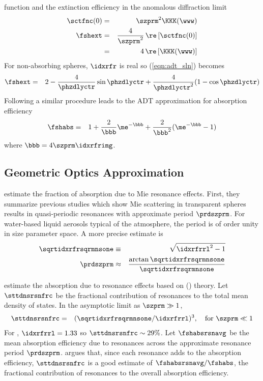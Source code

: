 \documentclass[12pt]{article}
\begin{document}
function and the extinction efficiency in the anomalous diffraction
limit 
\begin{eqnarray}
\sctfnc(0) & = & \szprm^{2} \KKK(\www) \nonumber \\
\fshext & = & \frac{4}{\szprm^{2}} \, \re \, [\sctfnc(0)] \nonumber \\
& = & 4 \, \re \, [\KKK(\www)]
\label{eqn:adt_sln}
\end{eqnarray}
For non-absorbing spheres, $\idxrfr$ is real so (\ref{eqn:adt_sln})
becomes
\begin{eqnarray}
\fshext & = & 2 - \frac{4}{\phzdlyctr} \sin \phzdlyctr +
\frac{4}{\phzdlyctr^{2}} ( 1 - \cos \phzdlyctr )
\label{eqn:adt_sln_ext}
\end{eqnarray}
Following a similar procedure \cite[]{Lio02} leads to the ADT
approximation for absorption efficiency
\begin{eqnarray}
\fshabs & = & 1 + \frac{2}{\bbb} \me^{-\bbb} + \frac{2}{\bbb^{2}} (\me^{-\bbb}-1)
\label{eqn:adt_sln_abs}
\end{eqnarray}
where $\bbb = 4\szprm\idxrfrimg$.

\subsection[Geometric Optics Approximation]{Geometric Optics Approximation}\label{sxn:goa}
\cite{Nus03} estimate the fraction of absorption due to Mie resonance
effects. 
First, they summarize previous studies \cite[][]{Nus92,Van57} which
show Mie scattering in transparent spheres results in quasi-periodic
resonances with approximate period $\prdszprm$. 
For water-based liquid aerosols typical of the atmosphere, the period
is of order unity in size parameter space.
A more precise estimate is
\begin{eqnarray}
\sqrtidxrfrsqrmnsone & \equiv & \sqrt{\idxrfrrl^{2}-1} \\ 
\prdszprm & \approx & \frac{\arctan \sqrtidxrfrsqrmnsone}{\sqrtidxrfrsqrmnsone}
\label{eqn:prd_sz_prm_dfn}
\end{eqnarray}

\cite{Nus03} estimate the absorption due to resonance effects based  
on  () theory.
Let $\sttdnsrsnfrc$ be the fractional contribution of resonances to the
total mean density of states.
In the asymptotic limit as $\szprm \gg 1$,
\begin{eqnarray}
\sttdnsrsnfrc & = & (\sqrtidxrfrsqrmnsone/\idxrfrrl)^{3}, \quad \mbox{for~}\szprm \ll 1
\label{eqn:stt_dns_rsn_frc}
\end{eqnarray}
For \HdO, $\idxrfrrl = 1.33$ so $\sttdnsrsnfrc \sim 29\%$.
Let $\fshabsrsnavg$ be the mean absorption efficiency due to
resonances across the approximate resonance period $\prdszprm$.
\citeauthor{Nus03} argues that, since each resonance adds to the
absorption efficiency, $\sttdnsrsnfrc$ is a good estimate of 
$\fshabsrsnavg/\fshabs$, the fractional contribution of resonances
to the overall absorption efficiency.
\end{document}
